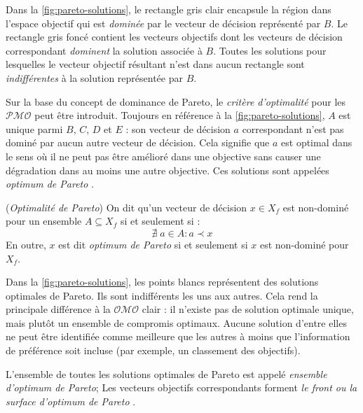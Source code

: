 Dans la \ref{fig:pareto-solutions}, le rectangle gris clair encapsule la région dans l'espace objectif qui est \textit{dominée} par le vecteur de décision représenté par $B$. Le rectangle gris foncé contient les vecteurs objectifs dont les vecteurs de décision correspondant \textit{dominent} la solution associée à $B$. Toutes les solutions pour lesquelles le vecteur objectif résultant n'est dans aucun rectangle sont \textit{indifférentes} à la solution représentée par $B$.

Sur la base du concept de dominance de Pareto, le \textit{critère d'optimalité} pour les $\mathcal{PMO}$ peut être introduit. Toujours en référence à la \ref{fig:pareto-solutions}, $A$ est unique parmi $B$, $C$, $D$ et $E$ : son vecteur de décision $a$ correspondant n'est pas dominé par aucun autre vecteur de décision. Cela signifie que $a$ est optimal dans le sens où il ne peut pas être amélioré dans une objective sans causer une dégradation dans au moins une autre objective. Ces solutions sont appelées \textit{optimum de Pareto} \cite{Branke08}.

\begin{definition}
(\textit{Optimalité de Pareto}) On dit qu'un vecteur de décision $x \in X_f$ est non-dominé pour un ensemble $A \subseteq X_f$ si et seulement si :
\begin{equation}
\nexists \; a \in A: a \prec x
\end{equation} 
En outre, $x$ est dit \textit{optimum de Pareto} si et seulement si $x$ est non-dominé pour $X_f$.
\end{definition}
Dans la \ref{fig:pareto-solutions}, les points blancs représentent des solutions optimales de Pareto. Ils sont indifférents les uns aux autres. Cela rend la principale différence à la $\mathcal{OMO}$ clair : il n'existe pas de solution optimale unique, mais plutôt un ensemble de compromis optimaux. Aucune solution d'entre elles ne peut être identifiée comme meilleure que les autres à moins que l'information de préférence soit incluse (par exemple, un classement des objectifs).

L'ensemble de toutes les solutions optimales de Pareto est appelé \textit{ensemble d'optimum de Pareto}; Les vecteurs objectifs correspondants forment \textit{le front ou la surface d'optimum de Pareto} \cite{Deb01}.

